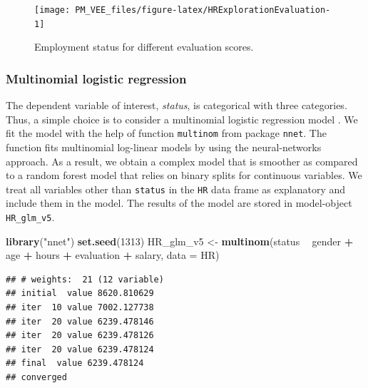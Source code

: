 \documentclass[12pt,]{krantz}
\newenvironment{Shaded}{\begin{snugshade}}{\end{snugshade}}
\newcommand{\DataTypeTok}[1]{\textcolor[rgb]{0.13,0.29,0.53}{#1}}
\newcommand{\DecValTok}[1]{\textcolor[rgb]{0.00,0.00,0.81}{#1}}
\newcommand{\KeywordTok}[1]{\textcolor[rgb]{0.13,0.29,0.53}{\textbf{#1}}}
\newcommand{\NormalTok}[1]{#1}
\newcommand{\OperatorTok}[1]{\textcolor[rgb]{0.81,0.36,0.00}{\textbf{#1}}}
\newcommand{\StringTok}[1]{\textcolor[rgb]{0.31,0.60,0.02}{#1}}
\theoremstyle{definition}
\theoremstyle{definition}
\theoremstyle{definition}
\theoremstyle{remark}
\begin{document}
\begin{figure}

{\centering \texttt{[image: PM\_VEE\_files/figure-latex/HRExplorationEvaluation-1]} 

}

\caption{Employment status for different evaluation scores.}\label{fig:HRExplorationEvaluation}
\end{figure}

\hypertarget{model-HR-mr}{%
\subsubsection{Multinomial logistic regression}\label{model-HR-mr}}

The dependent variable of interest, \emph{status}, is categorical with
three categories. Thus, a simple choice is to consider a multinomial
logistic regression model \citep{Venables2010}. We fit the model with
the help of function \texttt{multinom} from package \texttt{nnet}. The
function fits multinomial log-linear models by using the neural-networks
approach. As a result, we obtain a complex model that is smoother as
compared to a random forest model that relies on binary splits for
continuous variables. We treat all variables other than \texttt{status}
in the \texttt{HR} data frame as explanatory and include them in the
model. The results of the model are stored in model-object
\texttt{HR\_glm\_v5}.

\begin{Shaded}
\begin{Highlighting}[]
\KeywordTok{library}\NormalTok{(}\StringTok{"nnet"}\NormalTok{)}
\KeywordTok{set.seed}\NormalTok{(}\DecValTok{1313}\NormalTok{)}
\NormalTok{HR_glm_v5 <-}\StringTok{ }\KeywordTok{multinom}\NormalTok{(status }\OperatorTok{~}\StringTok{ }\NormalTok{gender }\OperatorTok{+}\StringTok{ }\NormalTok{age }\OperatorTok{+}\StringTok{ }\NormalTok{hours }\OperatorTok{+}\StringTok{ }\NormalTok{evaluation }\OperatorTok{+}\StringTok{ }\NormalTok{salary, }\DataTypeTok{data =}\NormalTok{ HR)}
\end{Highlighting}
\end{Shaded}

\begin{verbatim}
## # weights:  21 (12 variable)
## initial  value 8620.810629 
## iter  10 value 7002.127738
## iter  20 value 6239.478146
## iter  20 value 6239.478126
## iter  20 value 6239.478124
## final  value 6239.478124 
## converged
\end{verbatim}
\end{document}

